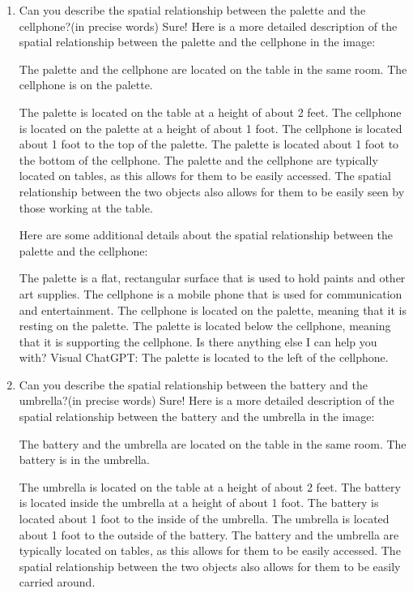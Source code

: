 \begin{enumerate}
    \item Can you describe the spatial relationship between the palette and the cellphone?(in precise words)
    \subitem 
    Sure! Here is a more detailed description of the spatial relationship between the palette and the cellphone in the image:
    
    The palette and the cellphone are located on the table in the same room. The cellphone is on the palette.
    
    The palette is located on the table at a height of about 2 feet.
    The cellphone is located on the palette at a height of about 1 foot.
    The cellphone is located about 1 foot to the top of the palette.
    The palette is located about 1 foot to the bottom of the cellphone.
    The palette and the cellphone are typically located on tables, as this allows for them to be easily accessed. The spatial relationship between the two objects also allows for them to be easily seen by those working at the table.
    
    Here are some additional details about the spatial relationship between the palette and the cellphone:
    
    The palette is a flat, rectangular surface that is used to hold paints and other art supplies.
    The cellphone is a mobile phone that is used for communication and entertainment.
    The cellphone is located on the palette, meaning that it is resting on the palette.
    The palette is located below the cellphone, meaning that it is supporting the cellphone.
    Is there anything else I can help you with?
    \subitem Visual ChatGPT: The palette is located to the left of the cellphone.
    \item Can you describe the spatial relationship between the battery and the umbrella?(in precise words)
    \subitem Sure! Here is a more detailed description of the spatial relationship between the battery and the umbrella in the image:

    The battery and the umbrella are located on the table in the same room. The battery is in the umbrella.
    
    The umbrella is located on the table at a height of about 2 feet.
    The battery is located inside the umbrella at a height of about 1 foot.
    The battery is located about 1 foot to the inside of the umbrella.
    The umbrella is located about 1 foot to the outside of the battery.
    The battery and the umbrella are typically located on tables, as this allows for them to be easily accessed. The spatial relationship between the two objects also allows for them to be easily carried around.
    

\end{enumerate}
